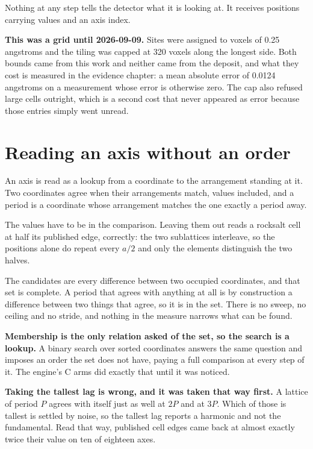 Nothing at any step tells the detector what it is looking at. It receives positions carrying values and an axis index.

\textbf{This was a grid until 2026-09-09.} Sites were assigned to voxels of 0.25 angstroms and the tiling was capped at 320 voxels along the longest side. Both bounds came from this work and neither came from the deposit, and what they cost is measured in the evidence chapter: a mean absolute error of 0.0124 angstroms on a measurement whose error is otherwise zero. The cap also refused large cells outright, which is a second cost that never appeared as error because those entries simply went unread.

\section{Reading an axis without an order}

An axis is read as a lookup from a coordinate to the arrangement standing at it. Two coordinates agree when their arrangements match, values included, and a period is a coordinate whose arrangement matches the one exactly a period away.

The values have to be in the comparison. Leaving them out reads a rocksalt cell at half its published edge, correctly: the two sublattices interleave, so the positions alone do repeat every $a/2$ and only the elements distinguish the two halves.

The candidates are every difference between two occupied coordinates, and that set is complete. A period that agrees with anything at all is by construction a difference between two things that agree, so it is in the set. There is no sweep, no ceiling and no stride, and nothing in the measure narrows what can be found.

\textbf{Membership is the only relation asked of the set, so the search is a lookup.} A binary search over sorted coordinates answers the same question and imposes an order the set does not have, paying a full comparison at every step of it. The engine's C arms did exactly that until it was noticed.

\textbf{Taking the tallest lag is wrong, and it was taken that way first.} A lattice of period $P$ agrees with itself just as well at $2P$ and at $3P$. Which of those is tallest is settled by noise, so the tallest lag reports a harmonic and not the fundamental. Read that way, published cell edges came back at almost exactly twice their value on ten of eighteen axes.

